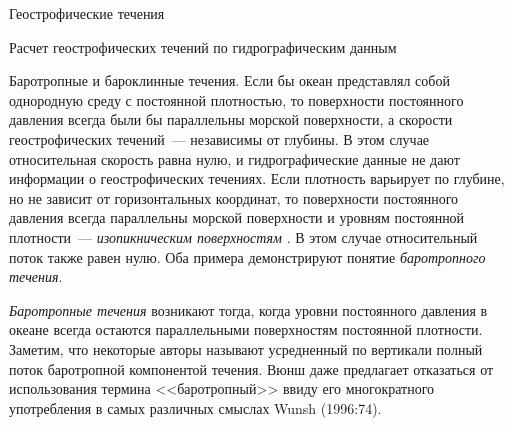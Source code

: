 \begin{chapter}{Геострофические течения}
\begin{section}{Расчет геострофических течений по гидрографическим данным}
\begin{paragraph}{Баротропные и бароклинные течения.}
Если бы океан представлял собой однородную среду с постоянной
плотностью, то поверхности постоянного давления всегда были бы
параллельны морской поверхности, а скорости геострофических течений~---
независимы от глубины. В этом случае относительная скорость
равна нулю, и гидрографические 
данные не дают 
информации о геострофических течениях. Если плотность варьирует
по глубине, но не зависит от горизонтальных координат, то поверхности 
постоянного давления всегда параллельны морской поверхности и уровням 
постоянной плотности~--- \emph{изопикническим поверхностям}%
. В этом случае
относительный поток также равен нулю. Оба примера демонстрируют понятие
\emph{баротропного течения}.
%

\emph{Баротропные течения} 
возникают тогда, когда уровни постоянного
давления в океане всегда остаются параллельными поверхностям
постоянной плотности. Заметим, что некоторые авторы называют
усредненный по вертикали полный поток баротропной компонентой
течения. Вюнш даже предлагает отказаться от использования
термина <<баротропный>> ввиду его многократного употребления в самых
различных смыслах Wunsh (1996:74).
%


\end{paragraph}
\end{section}
\end{chapter}
